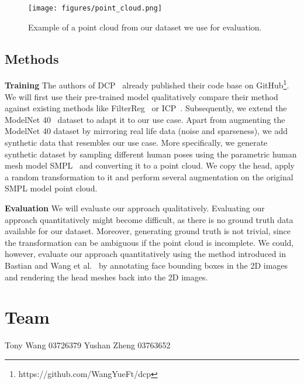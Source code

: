 \documentclass[a4paper,pagesize 10pt]{scrartcl}
\begin{document}
\begin{figure}[!ht]
    \centering
    \texttt{[image: figures/point\_cloud.png]}
    \caption{Example of a point cloud from our dataset we use for evaluation.}
    \label{fig:example_pcd}
\end{figure}

\subsection{Methods}

\textbf{Training} The authors of DCP~\cite{dcp} already published their code base on GitHub\footnote{https://github.com/WangYueFt/dcp}.
We will first use their pre-trained model qualitatively compare their method against existing methods like FilterReg~\cite{filterreg} or ICP~\cite{icp}.
Subsequently, we extend the ModelNet 40~\cite{modelnet40} dataset to adapt it to our use case.
Apart from augmenting the ModelNet 40 dataset by mirroring real life data (noise and sparseness), we add synthetic data that resembles our use case.
More specifically, we generate synthetic dataset by sampling different human poses using the parametric human mesh model SMPL~\cite{SMPL:2015} and converting it to a point cloud. 
We copy the head, apply a random transformation to it and perform several augmentation on the original SMPL model point cloud.

\noindent\textbf{Evaluation}
We will evaluate our approach qualitatively.
Evaluating our approach quantitatively might become difficult, as there is no ground truth data available for our dataset.
Moreover, generating ground truth is not trivial, since the transformation can be ambiguous if the point cloud is incomplete.
We could, however, evaluate our approach quantitatively using the method introduced in Bastian and Wang et al.~\cite{disguisor} by annotating face bounding boxes in the 2D images and rendering the head meshes back into the 2D images.


\section{Team}
Tony Wang 03726379
\newline
Yushan Zheng 03763652

{\small
	
	
}
\end{document}
